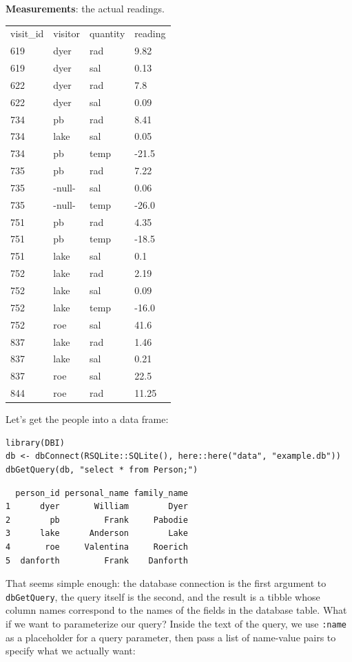 \noindent
\textbf{Measurements}: the actual readings.

\begin{longtable}[]{llll}
visit\_id & visitor & quantity & reading\\
619 & dyer & rad & 9.82\\
619 & dyer & sal & 0.13\\
622 & dyer & rad & 7.8\\
622 & dyer & sal & 0.09\\
734 & pb & rad & 8.41\\
734 & lake & sal & 0.05\\
734 & pb & temp & -21.5\\
735 & pb & rad & 7.22\\
735 & -null- & sal & 0.06\\
735 & -null- & temp & -26.0\\
751 & pb & rad & 4.35\\
751 & pb & temp & -18.5\\
751 & lake & sal & 0.1\\
752 & lake & rad & 2.19\\
752 & lake & sal & 0.09\\
752 & lake & temp & -16.0\\
752 & roe & sal & 41.6\\
837 & lake & rad & 1.46\\
837 & lake & sal & 0.21\\
837 & roe & sal & 22.5\\
844 & roe & rad & 11.25\\
\end{longtable}

Let's get the people into a data frame:

\begin{lstlisting}
library(DBI)
db <- dbConnect(RSQLite::SQLite(), here::here("data", "example.db"))
dbGetQuery(db, "select * from Person;")
\end{lstlisting}

\begin{lstlisting}
  person_id personal_name family_name
1      dyer       William        Dyer
2        pb         Frank     Pabodie
3      lake      Anderson        Lake
4       roe     Valentina     Roerich
5  danforth         Frank    Danforth
\end{lstlisting}

That seems simple enough:
the database connection is the first argument to \texttt{dbGetQuery},
the query itself is the second,
and the result is a tibble whose column names correspond to the names of the fields in the database table.
What if we want to parameterize our query?
Inside the text of the query,
we use \texttt{:name} as a placeholder for a query parameter,
then pass a list of name-value pairs to specify what we actually want:

